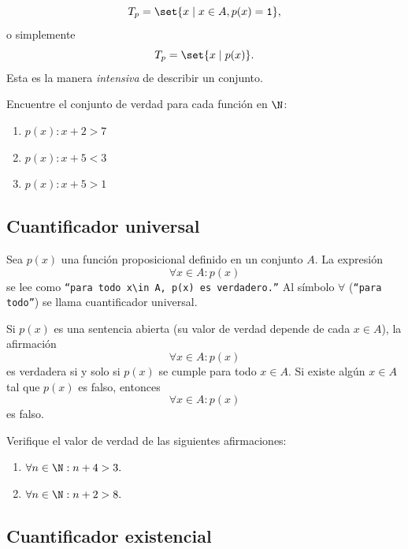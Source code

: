  $$T_{p}=\set{x \mid x\in A, p(x)=\texttt{1}},$$
 o simplemente
 $$
 T_{p}=\set{x \mid p(x)}.
 $$
Esta es la manera \emph{intensiva} de describir un conjunto.



 \begin{resuelto}
  \label{lip:exmp:4.7}
  Encuentre el conjunto de verdad para cada función en $\N$:
  \begin{enumerate}
   \item $p(x): x+2>7$
   \item $p(x): x+5<3$
   \item $p(x): x+5>1$
  \end{enumerate}

 \end{resuelto}



\subsection{Cuantificador universal}


 Sea $p(x)$ una función proposicional definido en un conjunto $A.$ La expresión
 \[
 \label{lip:4.1}
   \forall x \in A: p(x)
 \]
 se lee como  \texttt{``para todo $x\in A,$ $p(x)$ es verdadero.''}  Al símbolo $\forall$ (\texttt{``para todo''}) se llama cuantificador universal.

 Si $p(x)$ es una sentencia abierta (su valor de verdad depende de cada $x\in A$), la afirmación
 $$\forall x\in A: p(x)$$ es verdadera si y solo si $p(x)$ se cumple para todo $x\in A.$  Si existe algún $x\in A$ tal que $p(x)$ es falso, entonces $$\forall x\in A: p(x)$$ es falso.



 \begin{resuelto}
  \label{lip:exmp:4.8}
  Verifique el valor de verdad de las siguientes afirmaciones:
  \begin{enumerate}
   \item $\forall n \in \N: n+4>3.$
   \item $\forall n \in \N: n+2>8.$
  \end{enumerate}

 \end{resuelto}



\subsection{Cuantificador existencial}


